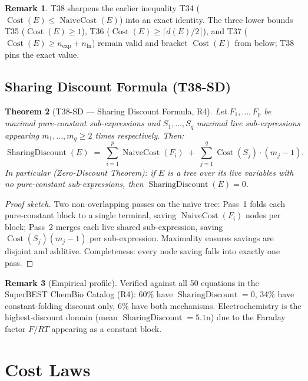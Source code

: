 \documentclass[12pt,a4paper]{article}
\newtheorem{theorem}{Theorem}[section]
\theoremstyle{definition}
\newtheorem{remark}[theorem]{Remark}
\newcommand{\Cost}{\operatorname{Cost}}
\newcommand{\NC}{\operatorname{NaiveCost}}
\newcommand{\SD}{\operatorname{SharingDiscount}}
\begin{document}
\begin{remark}
T38 sharpens the earlier inequality T34 ($\Cost(E) \leq \NC(E)$) into an
exact identity.  The three lower bounds T35 ($\Cost(E)\geq 1$), T36
($\Cost(E)\geq \lceil d(E)/2\rceil$), and T37 ($\Cost(E)\geq n_{\exp}+n_{\ln}$)
remain valid and bracket $\Cost(E)$ from below; T38 pins the exact value.
\end{remark}

\subsection{Sharing Discount Formula (T38-SD)}

\begin{theorem}[T38-SD --- Sharing Discount Formula, R4]
\label{thm:SD}
Let $F_1,\ldots,F_p$ be maximal pure-constant sub-expressions and
$S_1,\ldots,S_q$ maximal live sub-expressions appearing $m_1,\ldots,m_q \geq 2$
times respectively.  Then:
\[
  \SD(E)
  \;=\;
  \sum_{i=1}^{p} \NC(F_i)
  \;+\;
  \sum_{j=1}^{q} \Cost(S_j)\cdot(m_j - 1).
\]
In particular (Zero-Discount Theorem): if $E$ is a tree over its live
variables with no pure-constant sub-expressions, then $\SD(E)=0$.
\end{theorem}

\begin{proof}[Proof sketch]
Two non-overlapping passes on the na\"{i}ve tree: Pass~1 folds each
pure-constant block to a single terminal, saving $\NC(F_i)$ nodes per block;
Pass~2 merges each live shared sub-expression, saving $\Cost(S_j)(m_j-1)$
per sub-expression.  Maximality ensures savings are disjoint and additive.
Completeness: every node saving falls into exactly one pass.
\end{proof}

\begin{remark}[Empirical profile]
Verified against all 50 equations in the SuperBEST ChemBio Catalog (R4):
60\% have $\SD=0$, 34\% have constant-folding discount only, 6\% have both
mechanisms.  Electrochemistry is the highest-discount domain (mean $\SD=5.1$n)
due to the Faraday factor $F/RT$ appearing as a constant block.
\end{remark}

\section{Cost Laws}
\label{sec:laws}
\end{document}
